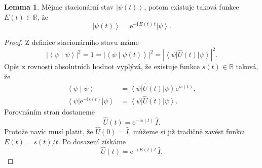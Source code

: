 \documentclass[10pt,a4paper]{article}
\theoremstyle{definition}
\newtheorem{lemma}[theorem]{Lemma}
\newcommand{\const}[1]{\mathrm{#1}}
\newcommand{\abs}[1]{\left| #1 \right|}
\newcommand{\bra}[1]{\left< #1 \right|}
\newcommand{\ket}[1]{\left| #1 \right>}
\newcommand{\braket}[2]{\left< #1 \middle| #2 \right>}
\newcommand{\e}[1]{\const{e}^{#1}}
\renewcommand{\i}{\const{i}}
\def\R{\mathbb{R}}
\def\1{\hat{I}}
\begin{document}
\begin{lemma}
    Mějme stacionární stav $\ket{\psi(t)}$, potom existuje taková funkce $E(t) \in \R$, že
    \begin{equation*}
        \ket{\psi(t)} = \e{-\i \, E(t) \, t} \ket{\psi}.
    \end{equation*}
\end{lemma}
\begin{proof}
    Z definice stacionárního stavu máme
    \begin{equation*}
        \abs{\braket{\psi}{\psi}}^2
        = 1
        = \abs{\braket{\psi}{\psi(t)}}^2
        = \abs{\bra{\psi} \hat{U}(t) \ket{\psi}}^2.
    \end{equation*}
    Opět z rovnosti absolutních hodnot vyplývá, že existuje funkce $s(t) \in \R$ taková, že
    \begin{align*}
        \braket{\psi}{\psi}
        &= \bra{\psi} \hat{U}(t) \ket{\psi} \e{\i s(t)},
        \\
        \bra{\psi} \e{-\i s(t)} \ket{\psi}
        &= \bra{\psi} \hat{U}(t) \ket{\psi}.
    \end{align*}
    Porovnáním stran dostaneme
    \begin{equation*}
        \hat U(t) = \e{-\i s(t)} \, \1.
    \end{equation*}
    Protože navíc musí platit, že $\hat U(0) = \1$, můžeme si již tradičně zavést funkci $E(t) = s(t) / t$. Po dosazení získáme
    \begin{equation*}
        \hat{U}(t) = \e{-\i \, E(t) \, t} \, \1.
    \end{equation*}
\end{proof}
\end{document}

